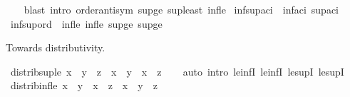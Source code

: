 \begin{isabellebody}
%
\isadelimproof
\ \ %
\endisadelimproof
%
\isatagproof
{}\isamarkupfalse%
\ {\isacharparenleft}{\kern0pt}blast\ intro{\isacharcolon}{\kern0pt}\ order{\isachardot}{\kern0pt}antisym\ sup{\isacharunderscore}{\kern0pt}ge{}\ sup{\isacharunderscore}{\kern0pt}least\ inf{\isacharunderscore}{\kern0pt}le{}{\isacharparenright}{\kern0pt}%
\endisatagproof
{\isafoldproof}%
%
\isadelimproof
\isanewline
%
\endisadelimproof
\isanewline
{}\isamarkupfalse%
\ inf{\isacharunderscore}{\kern0pt}sup{\isacharunderscore}{\kern0pt}aci\ {\isacharequal}{\kern0pt}\ inf{\isacharunderscore}{\kern0pt}aci\ sup{\isacharunderscore}{\kern0pt}aci\isanewline
\isanewline
{}\isamarkupfalse%
\ inf{\isacharunderscore}{\kern0pt}sup{\isacharunderscore}{\kern0pt}ord\ {\isacharequal}{\kern0pt}\ inf{\isacharunderscore}{\kern0pt}le{}\ inf{\isacharunderscore}{\kern0pt}le{}\ sup{\isacharunderscore}{\kern0pt}ge{}\ sup{\isacharunderscore}{\kern0pt}ge{}%
\begin{isamarkuptext}%
Towards distributivity.%
\end{isamarkuptext}\isamarkuptrue%
\isamarkupfalse%
\ distrib{\isacharunderscore}{\kern0pt}sup{\isacharunderscore}{\kern0pt}le{\isacharcolon}{\kern0pt}\ {\isachardoublequoteopen}x\ {\isasymsqunion}\ {\isacharparenleft}{\kern0pt}y\ {\isasymsqinter}\ z{\isacharparenright}{\kern0pt}\ {\isasymle}\ {\isacharparenleft}{\kern0pt}x\ {\isasymsqunion}\ y{\isacharparenright}{\kern0pt}\ {\isasymsqinter}\ {\isacharparenleft}{\kern0pt}x\ {\isasymsqunion}\ z{\isacharparenright}{\kern0pt}{\isachardoublequoteclose}\isanewline
%
\isadelimproof
\ \ %
\endisadelimproof
%
\isatagproof
{}\isamarkupfalse%
\ {\isacharparenleft}{\kern0pt}auto\ intro{\isacharcolon}{\kern0pt}\ le{\isacharunderscore}{\kern0pt}infI{}\ le{\isacharunderscore}{\kern0pt}infI{}\ le{\isacharunderscore}{\kern0pt}supI{}\ le{\isacharunderscore}{\kern0pt}supI{}{\isacharparenright}{\kern0pt}%
\endisatagproof
{\isafoldproof}%
%
\isadelimproof
\isanewline
%
\endisadelimproof
\isanewline
{}\isamarkupfalse%
\ distrib{\isacharunderscore}{\kern0pt}inf{\isacharunderscore}{\kern0pt}le{\isacharcolon}{\kern0pt}\ {\isachardoublequoteopen}{\isacharparenleft}{\kern0pt}x\ {\isasymsqinter}\ y{\isacharparenright}{\kern0pt}\ {\isasymsqunion}\ {\isacharparenleft}{\kern0pt}x\ {\isasymsqinter}\ z{\isacharparenright}{\kern0pt}\ {\isasymle}\ x\ {\isasymsqinter}\ {\isacharparenleft}{\kern0pt}y\ {\isasymsqunion}\ z{\isacharparenright}{\kern0pt}{\isachardoublequoteclose}\isanewline

\end{isabellebody}
